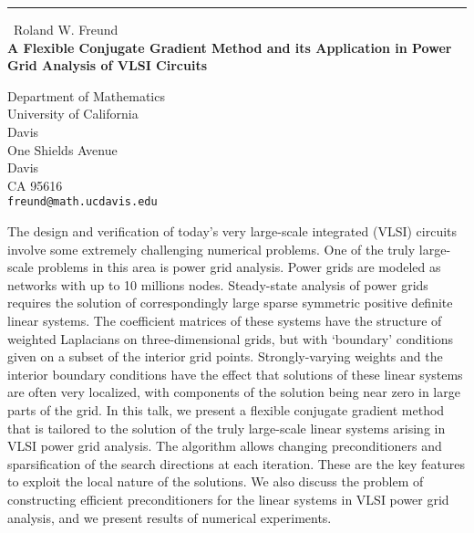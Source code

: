 \documentclass{report}
\begin{document}
\begin{center}
\rule{6in}{1pt} \
{\large Roland W. Freund \\
{\bf A Flexible Conjugate Gradient Method and its Application in Power Grid Analysis of VLSI Circuits }}

Department of Mathematics \\ University of California \\ Davis \\ One Shields Avenue \\ Davis \\ CA 95616
\\
{\tt freund@math.ucdavis.edu}\end{center}

The design and verification of today's very large-scale
integrated (VLSI) circuits involve some extremely challenging
numerical problems. One of the truly large-scale problems
in this area is power grid analysis. Power grids are modeled
as networks with up to 10 millions nodes. Steady-state analysis
of power grids requires the solution of correspondingly large
sparse symmetric positive definite linear systems. The
coefficient matrices of these systems have the structure of
weighted Laplacians on three-dimensional grids, but with `boundary'
conditions given on a subset of the interior grid points.
Strongly-varying weights and the interior boundary conditions
have the effect that solutions of these linear systems are often
very localized, with components of the solution being near zero
in large parts of the grid. In this talk, we present a flexible
conjugate gradient method that is tailored to the solution of the
truly large-scale linear systems arising in VLSI power grid
analysis. The algorithm allows changing preconditioners and
sparsification of the search directions at each iteration.
These are the key features to exploit the local nature of the
solutions. We also discuss the problem of constructing
efficient preconditioners for the linear systems in VLSI power grid
analysis, and we present results of numerical experiments.
\end{document}
